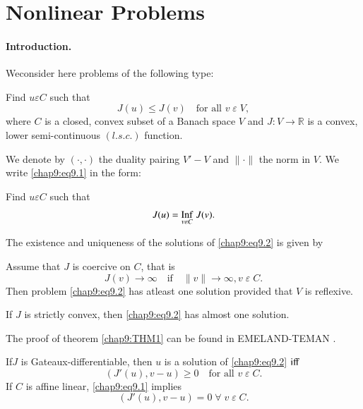 
\chapter{Nonlinear Problems}\label{chap9}

\subsubsection{\bf Introduction.} We\pageoriginale consider here
problems of the following type:

Find $u\varepsilon C$ such that
\begin{equation}\label{chap9:eq9.1}
J(u)\leq J(v)\quad\text{for all } v\;\varepsilon \;V,
\end{equation}
where $C$ is a closed, convex subset of a Banach space $V$ and
$J:V\to\mathbb{R}$ is a convex, lower semi-continuous $(l.s.c.)$ function.

We denote by $(\cdotp,\cdotp)$ the duality pairing $V'-V$ and
$\parallel \cdotp\parallel$ the norm in $V$. We write
\eqref{chap9:eq9.1} in the form:

Find $u\varepsilon C$ such that 
\begin{equation}\label{chap9:eq9.2}
J(u)=\underset{v\varepsilon C}{\operatorname{Inf}}\;J(v).
\end{equation}

The existence and uniqueness of the solutions of \eqref{chap9:eq9.2}
is given by 

\setcounter{THM}{0}
\begin{THM}\label{chap9:THM1}
Assume that $J$ is coercive on $C$, that is 
\begin{equation}\label{chap9:eq9.3}
J(v)\to\infty\quad\text{if}\quad\parallel v\parallel\to\infty, v
\;\varepsilon \;C.
\end{equation}
Then problem \eqref{chap9:eq9.2} has atleast one solution provided
that $V$ is reflexive.

If $J$ is strictly convex, then \eqref{chap9:eq9.2} has almost one solution.
\end{THM}

The proof of theorem \ref{chap9:THM1} can be found in EMELAND-TEMAN \cite{key15}.

\setcounter{exercise}{0}
\begin{exercise}\label{chap9:exr1}
If\pageoriginale $J$ is Gateaux-differentiable, then $u$ is a solution
of \eqref{chap9:eq9.2} $\operatorname{iff}$
$$
(J'(u),v-u)\geq 0\quad\text{for all } v\;\varepsilon \;C.
$$
If $C$ is affine linear, \eqref{chap9:eq9.1} implies 
$$
(J'(u),v-u)=0\;\forall \;v\;\varepsilon\;C.
$$
\end{exercise}

